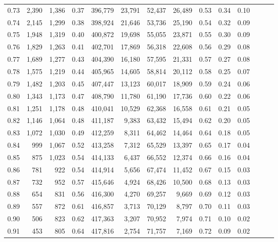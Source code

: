 \begin{tabular}{rrrrrrrrrrrrrr}
0.73 &  2,390 &  1,386 &  0.37 &  396,779 &   23,791 &  52,437 &  26,489 &  0.53 &  0.34 &      0.10 \\
0.74 &  2,145 &  1,299 &  0.38 &  398,924 &   21,646 &  53,736 &  25,190 &  0.54 &  0.32 &      0.09 \\
0.75 &  1,948 &  1,319 &  0.40 &  400,872 &   19,698 &  55,055 &  23,871 &  0.55 &  0.30 &      0.09 \\
0.76 &  1,829 &  1,263 &  0.41 &  402,701 &   17,869 &  56,318 &  22,608 &  0.56 &  0.29 &      0.08 \\
0.77 &  1,689 &  1,277 &  0.43 &  404,390 &   16,180 &  57,595 &  21,331 &  0.57 &  0.27 &      0.08 \\
0.78 &  1,575 &  1,219 &  0.44 &  405,965 &   14,605 &  58,814 &  20,112 &  0.58 &  0.25 &      0.07 \\
0.79 &  1,482 &  1,203 &  0.45 &  407,447 &   13,123 &  60,017 &  18,909 &  0.59 &  0.24 &      0.06 \\
0.80 &  1,343 &  1,173 &  0.47 &  408,790 &   11,780 &  61,190 &  17,736 &  0.60 &  0.22 &      0.06 \\
0.81 &  1,251 &  1,178 &  0.48 &  410,041 &   10,529 &  62,368 &  16,558 &  0.61 &  0.21 &      0.05 \\
0.82 &  1,146 &  1,064 &  0.48 &  411,187 &    9,383 &  63,432 &  15,494 &  0.62 &  0.20 &      0.05 \\
0.83 &  1,072 &  1,030 &  0.49 &  412,259 &    8,311 &  64,462 &  14,464 &  0.64 &  0.18 &      0.05 \\
0.84 &    999 &  1,067 &  0.52 &  413,258 &    7,312 &  65,529 &  13,397 &  0.65 &  0.17 &      0.04 \\
0.85 &    875 &  1,023 &  0.54 &  414,133 &    6,437 &  66,552 &  12,374 &  0.66 &  0.16 &      0.04 \\
0.86 &    781 &    922 &  0.54 &  414,914 &    5,656 &  67,474 &  11,452 &  0.67 &  0.15 &      0.03 \\
0.87 &    732 &    952 &  0.57 &  415,646 &    4,924 &  68,426 &  10,500 &  0.68 &  0.13 &      0.03 \\
0.88 &    654 &    831 &  0.56 &  416,300 &    4,270 &  69,257 &   9,669 &  0.69 &  0.12 &      0.03 \\
0.89 &    557 &    872 &  0.61 &  416,857 &    3,713 &  70,129 &   8,797 &  0.70 &  0.11 &      0.03 \\
0.90 &    506 &    823 &  0.62 &  417,363 &    3,207 &  70,952 &   7,974 &  0.71 &  0.10 &      0.02 \\
0.91 &    453 &    805 &  0.64 &  417,816 &    2,754 &  71,757 &   7,169 &  0.72 &  0.09 &      0.02 \\

\end{tabular}
